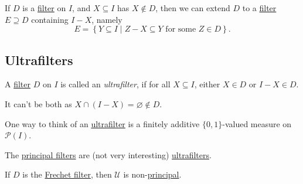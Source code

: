 \begin{eg}[Extend]\label{eg:extend}
	If \(D\) is a \hyperref[def:filter]{filter} on \(I\), and \(X \subseteq I\) has \(X \notin D\), then we can extend \(D\) to a \hyperref[def:filter]{filter} \(E \supseteq D\) containing \(I - X\), namely
	\[
		E = \left\{ Y \subseteq I \mid Z-X\subseteq Y \text{ for some \(Z\in D\)} \right\}.
	\]
\end{eg}

\subsection{Ultrafilters}
\begin{definition}[Ultrafilter]\label{def:ultrafilter}
	A \hyperref[def:filter]{filter} \(D\) on \(I\) is called an \emph{ultrafilter}, if for all \(X \subseteq I\), either \(X\in D\) or \(I - X \in D\).
\end{definition}

\begin{note}
	It can't be both as \(X \cap (I - X) = \varnothing \notin D\).
\end{note}

\begin{intuition}
	One way to think of an \hyperref[def:ultrafilter]{ultrafilter} is a finitely additive \(\{0, 1\}\)-valued measure on \(\mathcal{P} (I)\).
\end{intuition}

\begin{eg}
	The \hyperref[eg:principal-filter]{principal filters} are (not very interesting) \hyperref[def:ultrafilter]{ultrafilters}.
\end{eg}

\begin{eg}
	If \(D\) is the \hyperref[eg:Frechet-filter]{Frechet filter}, then \(\mathcal{U} \) is non-\hyperref[eg:principal-filter]{principal}.
\end{eg}

